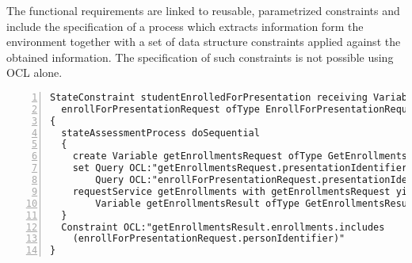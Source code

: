 The functional requirements are linked to reusable, parametrized constraints and include the specification of a process which extracts information form the environment together with a set of data structure constraints applied against the obtained information. The specification of such constraints is not possible using OCL alone.
\tiny \begin{lstlisting}[numbers=left,escapechar=|]
StateConstraint studentEnrolledForPresentation receiving Variable 
  enrollForPresentationRequest ofType EnrollForPresentationRequest
{
  stateAssessmentProcess doSequential
  {
    create Variable getEnrollmentsRequest ofType GetEnrollmentsRequest
    set Query OCL:"getEnrollmentsRequest.presentationIdentifier" equalTo
        Query OCL:"enrollForPresentationRequest.presentationIdentifier"
    requestService getEnrollments with getEnrollmentsRequest yielding
        Variable getEnrollmentsResult ofType GetEnrollmentsResult
  }
  Constraint OCL:"getEnrollmentsResult.enrollments.includes
    (enrollForPresentationRequest.personIdentifier)"
}
\end{lstlisting}\normalsize

